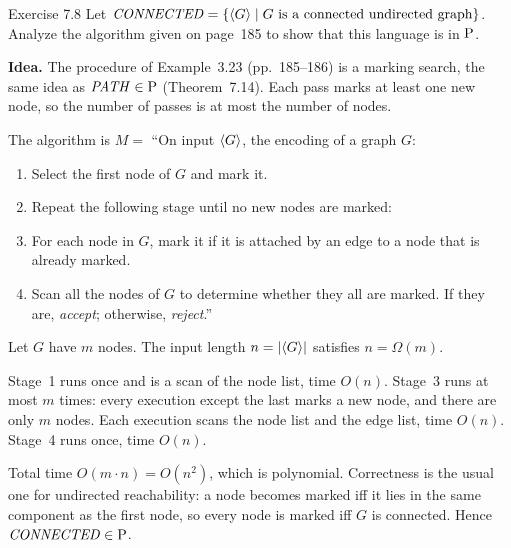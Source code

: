 \begin{question}{Exercise 7.8}
Let $\mathit{CONNECTED}=\{\langle G\rangle\mid \text{$G$ is a connected undirected graph}\}$. Analyze the algorithm given on page~185 to show that this language is in $\mathrm{P}$.
\end{question}
\begin{soln}
\textbf{Idea.} The procedure of Example~3.23 (pp.~185--186) is a marking search, the same idea as $\mathit{PATH}\in\mathrm{P}$ (Theorem~7.14). Each pass marks at least one new node, so the number of passes is at most the number of nodes.

The algorithm is
$M=$ ``On input $\langle G\rangle$, the encoding of a graph $G$:
\begin{enumerate}
\item Select the first node of $G$ and mark it.
\item Repeat the following stage until no new nodes are marked:
\item \quad For each node in $G$, mark it if it is attached by an edge to a node that is already marked.
\item Scan all the nodes of $G$ to determine whether they all are marked. If they are, \emph{accept}; otherwise, \emph{reject}.''
\end{enumerate}

Let $G$ have $m$ nodes. The input length $n=|\langle G\rangle|$ satisfies $n=\Omega(m)$.

Stage~1 runs once and is a scan of the node list, time $O(n)$.
Stage~3 runs at most $m$ times: every execution except the last marks a new node, and there are only $m$ nodes. Each execution scans the node list and the edge list, time $O(n)$.
Stage~4 runs once, time $O(n)$.

Total time $O(m\cdot n)=O(n^2)$, which is polynomial. Correctness is the usual one for undirected reachability: a node becomes marked iff it lies in the same component as the first node, so every node is marked iff $G$ is connected. Hence $\mathit{CONNECTED}\in\mathrm{P}$.
\end{soln}

